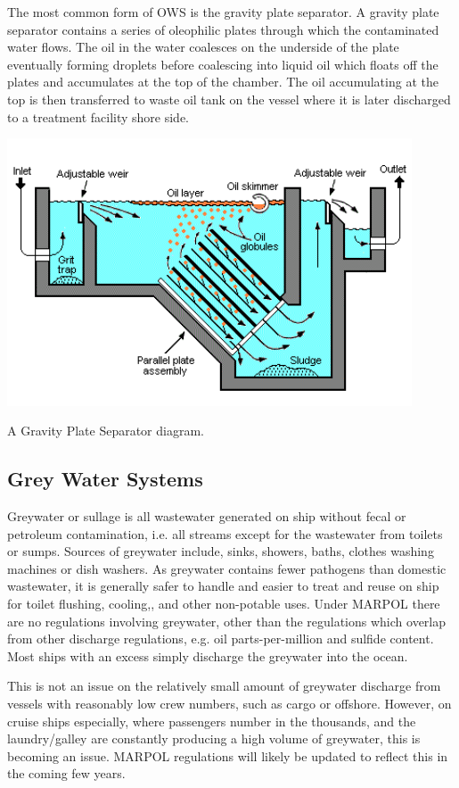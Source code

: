 \documentclass[11pt,a4paper]{article}
\begin{document}
The most common form of OWS is the gravity plate separator. A gravity plate separator contains a series of oleophilic plates through which the contaminated water flows. The oil in the water coalesces on the underside of the plate eventually forming droplets before coalescing into liquid oil which floats off the plates and accumulates at the top of the chamber. The oil accumulating at the top is then transferred to waste oil tank on the vessel where it is later discharged to a treatment facility shore side.
\begin{center}
\includegraphics[width=12cm]{oil}\par
A Gravity Plate Separator diagram.
\end{center}
\subsection{Grey Water Systems}
Greywater or sullage is all wastewater generated on ship without fecal or petroleum contamination, i.e. all streams except for the wastewater from toilets or sumps. Sources of greywater include, sinks, showers, baths, clothes washing machines or dish washers. As greywater contains fewer pathogens than domestic wastewater, it is generally safer to handle and easier to treat and reuse on ship for toilet flushing, cooling,, and other non-potable uses. Under MARPOL there are no regulations involving greywater, other than the regulations which overlap from other discharge regulations, e.g. oil parts-per-million and sulfide content. Most ships with an excess simply discharge the greywater into the ocean.

This is not an issue on the relatively small amount of greywater discharge from vessels with reasonably low crew numbers, such as cargo or offshore. However, on cruise ships especially, where passengers number in the thousands, and the laundry/galley are constantly producing a high volume of greywater, this is becoming an issue. MARPOL regulations will likely be updated to reflect this in the coming few years.
\end{document}
